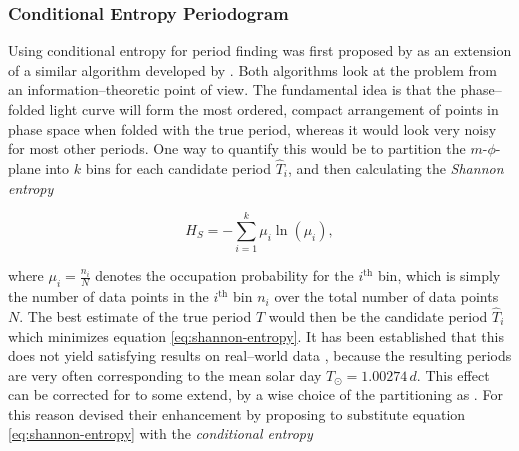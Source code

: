 


\subsubsection{Conditional Entropy Periodogram}
\label{subsubsec:conditional-entropy}

Using conditional entropy for period finding was first proposed by \citet{graham2013} as an extension of a similar algorithm developed by \citet{cincotta1995}. Both algorithms look at the problem from an information--theoretic point of view. The fundamental idea is that the phase--folded light curve will form the most ordered, compact arrangement of points in phase space when folded with the true period, whereas it would look very noisy for most other periods. One way to quantify this would be to partition the $m$-$\phi$-plane into $k$ bins for each candidate period $\hat T_i$, and then calculating the \emph{Shannon entropy}


\begin{equation}
\label{eq:shannon-entropy}
H_S = - \sum_{i=1}^k \mu_i \ln(\mu_i),
\end{equation}

where $\mu_i = \frac{n_i}{N}$ denotes the occupation probability for the $i^\text{th}$ bin, which is simply the number of data points in the $i^\text{th}$ bin $n_i$ over the total number of data points $N$. The best estimate of the true period $T$ would then be the candidate period $\hat T_i$ which minimizes equation \eqref{eq:shannon-entropy}. It has been established that this does not yield satisfying results on real--world data \citep{cincotta1999}, because the resulting periods are very often corresponding to the mean solar day $T_\odot = 1.00274 \, \unit{d}$. This effect can be corrected for to some extend, \eg by a wise choice of the partitioning as \citet{cincotta1999,drake2013}. For this reason \citeauthor{graham2013} devised their enhancement by proposing to substitute equation \eqref{eq:shannon-entropy} with the \emph{conditional entropy}


